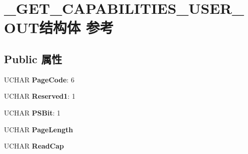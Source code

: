 \hypertarget{struct___g_e_t___c_a_p_a_b_i_l_i_t_i_e_s___u_s_e_r___o_u_t}{}\section{\+\_\+\+G\+E\+T\+\_\+\+C\+A\+P\+A\+B\+I\+L\+I\+T\+I\+E\+S\+\_\+\+U\+S\+E\+R\+\_\+\+O\+U\+T结构体 参考}
\label{struct___g_e_t___c_a_p_a_b_i_l_i_t_i_e_s___u_s_e_r___o_u_t}
\subsection*{Public 属性}
\begin{DoxyCompactItemize}
\item 
\mbox{\label{struct___g_e_t___c_a_p_a_b_i_l_i_t_i_e_s___u_s_e_r___o_u_t_a04530c2f605ef74f004b035881787c29}} 
U\+C\+H\+AR {\bfseries Page\+Code}\+: 6
\item 
\mbox{\label{struct___g_e_t___c_a_p_a_b_i_l_i_t_i_e_s___u_s_e_r___o_u_t_a8be9a8aec325ee2c66d0daf6a1063e3b}} 
U\+C\+H\+AR {\bfseries Reserved1}\+: 1
\item 
\mbox{\label{struct___g_e_t___c_a_p_a_b_i_l_i_t_i_e_s___u_s_e_r___o_u_t_accf2c6dd81118f950977c23eb27ee4fc}} 
U\+C\+H\+AR {\bfseries P\+S\+Bit}\+: 1
\item 
\mbox{\label{struct___g_e_t___c_a_p_a_b_i_l_i_t_i_e_s___u_s_e_r___o_u_t_a228740961c249fa6205e38db6a55a1f7}} 
U\+C\+H\+AR {\bfseries Page\+Length}
\item 
\mbox{\label{struct___g_e_t___c_a_p_a_b_i_l_i_t_i_e_s___u_s_e_r___o_u_t_ac28a878b072160c9239e58c9e9645106}} 
U\+C\+H\+AR {\bfseries Read\+Cap}
\item 
\mbox{\label{struct___g_e_t___c_a_p_a_b_i_l_i_t_i_e_s___u_s_e_r___o_u_t_a22d9fbd8dc0b5c217cb40ad8a23d90a5}} 

\end{DoxyCompactItemize}
